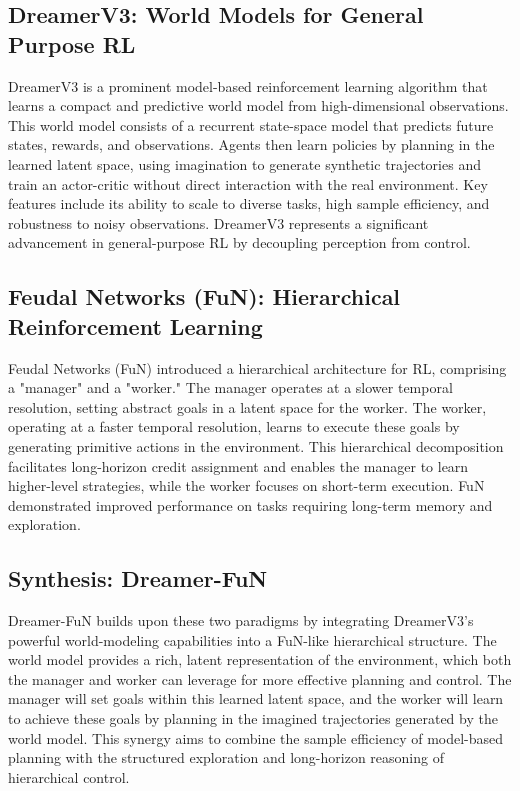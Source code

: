 \documentclass[conference]{IEEEtran}
\begin{document}
\subsection{DreamerV3: World Models for General Purpose RL}
DreamerV3 is a prominent model-based reinforcement learning algorithm that learns a compact and predictive world model from high-dimensional observations. This world model consists of a recurrent state-space model that predicts future states, rewards, and observations. Agents then learn policies by planning in the learned latent space, using imagination to generate synthetic trajectories and train an actor-critic without direct interaction with the real environment. Key features include its ability to scale to diverse tasks, high sample efficiency, and robustness to noisy observations. DreamerV3 represents a significant advancement in general-purpose RL by decoupling perception from control.

\subsection{Feudal Networks (FuN): Hierarchical Reinforcement Learning}
Feudal Networks (FuN) introduced a hierarchical architecture for RL, comprising a "manager" and a "worker." The manager operates at a slower temporal resolution, setting abstract goals in a latent space for the worker. The worker, operating at a faster temporal resolution, learns to execute these goals by generating primitive actions in the environment. This hierarchical decomposition facilitates long-horizon credit assignment and enables the manager to learn higher-level strategies, while the worker focuses on short-term execution. FuN demonstrated improved performance on tasks requiring long-term memory and exploration.

\subsection{Synthesis: Dreamer-FuN}
Dreamer-FuN builds upon these two paradigms by integrating DreamerV3's powerful world-modeling capabilities into a FuN-like hierarchical structure. The world model provides a rich, latent representation of the environment, which both the manager and worker can leverage for more effective planning and control. The manager will set goals within this learned latent space, and the worker will learn to achieve these goals by planning in the imagined trajectories generated by the world model. This synergy aims to combine the sample efficiency of model-based planning with the structured exploration and long-horizon reasoning of hierarchical control.
\end{document}
